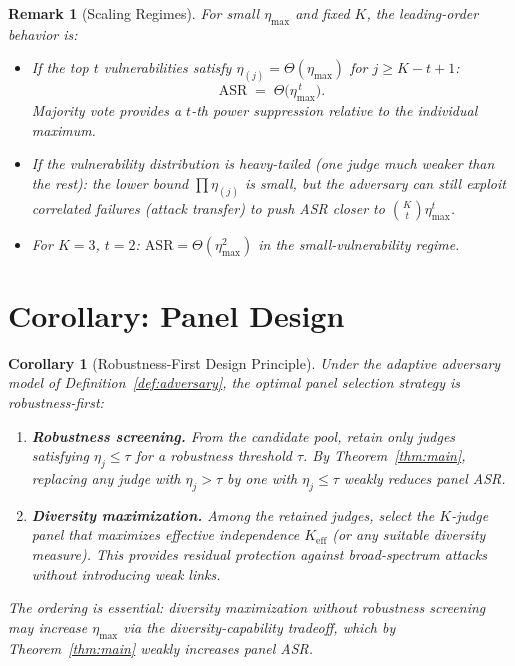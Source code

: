 \documentclass[11pt]{article}
\newtheorem{corollary}[theorem]{Corollary}
\newtheorem*{remark}{Remark}
\begin{document}
\begin{remark}[Scaling Regimes]
For small $\eta_{\max}$ and fixed $K$, the leading-order behavior is:
\begin{itemize}
    \item If the top $t$ vulnerabilities satisfy $\eta_{(j)} = \Theta(\eta_{\max})$ for $j \geq K{-}t{+}1$: \[ \mathrm{ASR} \;=\; \Theta\!\bigl(\eta_{\max}^{\,t}\bigr). \]
    Majority vote provides a $t$-th power suppression relative to the individual maximum.
    \item If the vulnerability distribution is \emph{heavy-tailed} (one judge much weaker than the rest): the lower bound $\prod \eta_{(j)}$ is small, but the adversary can still exploit correlated failures (attack transfer) to push ASR closer to $\binom{K}{t}\eta_{\max}^t$.
    \item For $K=3$, $t=2$: $\mathrm{ASR} = \Theta(\eta_{\max}^2)$ in the small-vulnerability regime.
\end{itemize}
\end{remark}


\section{Corollary: Panel Design}

\begin{corollary}[Robustness-First Design Principle]\label{cor:design}
Under the adaptive adversary model of Definition~\ref{def:adversary}, the optimal panel selection strategy is \emph{robustness-first}:
\begin{enumerate}[label=\textbf{Stage~\arabic*}:]
    \item \textbf{Robustness screening.} From the candidate pool, retain only judges satisfying $\eta_j \leq \tau$ for a robustness threshold $\tau$. By Theorem~\ref{thm:main}, replacing any judge with $\eta_j > \tau$ by one with $\eta_j \leq \tau$ weakly reduces panel ASR.
    \item \textbf{Diversity maximization.} Among the retained judges, select the $K$-judge panel that maximizes effective independence $K_{\mathrm{eff}}$ (or any suitable diversity measure). This provides residual protection against broad-spectrum attacks without introducing weak links.
\end{enumerate}
The ordering is essential: diversity maximization without robustness screening may increase $\eta_{\max}$ via the diversity-capability tradeoff, which by Theorem~\ref{thm:main} weakly increases panel ASR.
\end{corollary}
\end{document}
